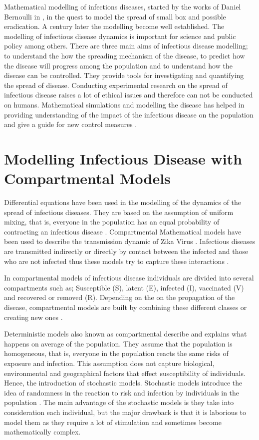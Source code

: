 Mathematical modelling of infections diseases, started by the works of Daniel Bernoulli in \cite{bernoulli1760essai}, in the quest to model the spread of small box and possible eradication. A century later the modelling become well established. The modelling of infectious disease dynamics is important for science and public policy among others. There are three main aims of infectious disease modelling; to understand the how the spreading mechanism of the disease, to  predict how the disease will progress among the population and to understand how the disease can be controlled. They provide tools for investigating and quantifying the spread of disease. Conducting experimental research on the spread of infectious disease raises a lot of ethical issues and therefore can not be conducted on humans. Mathematical simulations and modelling the disease has helped in providing understanding of the impact of the infectious disease on the population and give a guide for new control measures \citep{ming2016stochastic}.


\section{Modelling Infectious Disease with Compartmental Models}

Differential equations have been used in the modelling of the dynamics of the spread of infectious diseases. They are based on the assumption of uniform mixing, that is, everyone in the population has an equal probability of contracting an infectious disease \citep{kaplan2002emergency}.
Compartmental Mathematical models have been used to describe the transmission dynamic of Zika Virus \citep{gao2016}. Infectious diseases are transmitted indirectly  or directly by contact between the infected and those who are not infected thus these models try to capture these interactions \citep{sat}. 
 
In compartmental models of infectious disease individuals are divided into  several compartments such as; Susceptible (S), latent (E), infected (I), vaccinated (V) and recovered or removed (R). Depending on the on the propagation of the disease, compartmental models are built by combining these different classes or creating new ones \citep{li}.

 
Deterministic models also known as compartmental describe and explains what happens on average of the population. They assume that the population is homogeneous, that is, everyone in the population reacts the same risks of exposure and infection. This assumption does not capture biological, environmental and geographical  factors that effect susceptibility of individuals. Hence, the introduction of stochastic models. Stochastic models introduce the idea of randomness in the reaction to risk and infection by individuals in the population \citep{ming2016stochastic}. The main advantage of the stochastic models is they take into consideration each individual, but the major drawback is that it is laborious to model them as they require a lot of stimulation and sometimes become mathematically complex.
 
